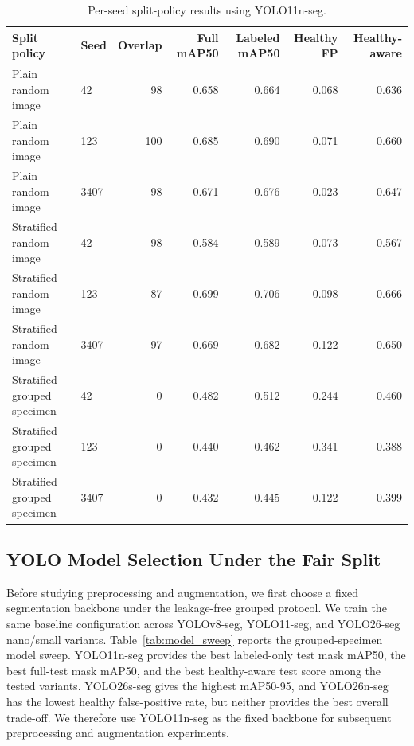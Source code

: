 \documentclass{svproc}
\begin{document}
\begin{table}
\caption{Per-seed split-policy results using YOLO11n-seg.}
\label{tab:split_policy_per_seed}
\begin{center}
\scriptsize
\begin{tabular}{llrrrrr}
\hline
Split policy & Seed & Overlap & Full mAP50 & Labeled mAP50 & Healthy FP & Healthy-aware \\
\hline
Plain random image & 42 & 98 & 0.658 & 0.664 & 0.068 & 0.636 \\
Plain random image & 123 & 100 & 0.685 & 0.690 & 0.071 & 0.660 \\
Plain random image & 3407 & 98 & 0.671 & 0.676 & 0.023 & 0.647 \\
Stratified random image & 42 & 98 & 0.584 & 0.589 & 0.073 & 0.567 \\
Stratified random image & 123 & 87 & 0.699 & 0.706 & 0.098 & 0.666 \\
Stratified random image & 3407 & 97 & 0.669 & 0.682 & 0.122 & 0.650 \\
Stratified grouped specimen & 42 & 0 & 0.482 & 0.512 & 0.244 & 0.460 \\
Stratified grouped specimen & 123 & 0 & 0.440 & 0.462 & 0.341 & 0.388 \\
Stratified grouped specimen & 3407 & 0 & 0.432 & 0.445 & 0.122 & 0.399 \\
\hline
\end{tabular}
\end{center}
\end{table}

\subsection{YOLO Model Selection Under the Fair Split}
Before studying preprocessing and augmentation, we first choose a fixed
segmentation backbone under the leakage-free grouped protocol. We train
the same baseline configuration across YOLOv8-seg, YOLO11-seg, and
YOLO26-seg nano/small variants.
Table~\ref{tab:model_sweep} reports the grouped-specimen model sweep.
YOLO11n-seg provides the best labeled-only test mask mAP50, the best
full-test mask mAP50, and the best healthy-aware test score among the
tested variants. YOLO26s-seg gives the highest mAP50-95, and YOLO26n-seg
has the lowest healthy false-positive rate, but neither provides the
best overall trade-off. We therefore use YOLO11n-seg as the fixed
backbone for subsequent preprocessing and augmentation experiments.
\end{document}
